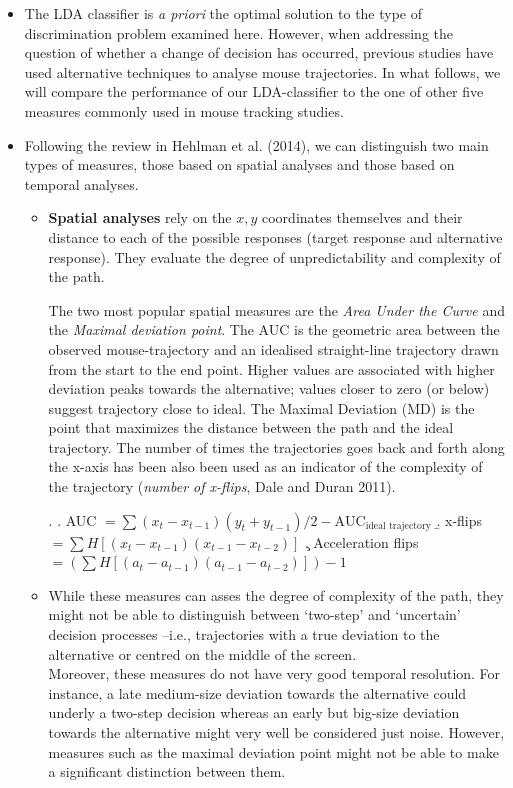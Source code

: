 \documentclass{article}
\begin{document}
\begin{itemize}

\item The LDA classifier is \emph{a priori} the optimal solution to the type of discrimination problem examined here. However, when addressing the question of whether a change of decision has occurred, previous studies have used alternative techniques to analyse mouse trajectories. In what follows, we will compare the performance of our LDA-classifier to the one of other five measures commonly used in mouse tracking studies. 

\item Following the review in Hehlman et al. (2014), we can distinguish two main types of measures, those based on spatial analyses and those based on temporal analyses. 

\begin{itemize}
\item \textbf{Spatial analyses} rely on the $x,y$ coordinates themselves and their distance to each of the possible responses (target response and alternative response). They evaluate the degree of unpredictability and complexity of the path. 

The two most popular spatial measures are the \textit{Area Under the Curve} and the \textit{Maximal deviation point}. The AUC is the geometric area between the observed mouse-trajectory and an idealised straight-line trajectory drawn from the start to the end point. Higher values are associated with higher deviation peaks towards the alternative; values closer to zero (or below) suggest trajectory close to ideal. 
The Maximal Deviation (MD) is the point that maximizes the distance between the path and the ideal trajectory.  
The number of times the trajectories goes back and forth along the x-axis has been also been used as an indicator of the complexity of the trajectory (\emph{number of x-flips}, Dale and Duran 2011).

\ex. 
\a. AUC \(= \sum (x_{t} -  x_{t-1})( y_{t} + y_{t-1})/2  - \text{AUC}_{\text{ideal trajectory}} \)
\b.  x-flips  \(= \sum H[(x_{t} - x_{t-1})(x_{t-1} - x_{t-2})] \)
\c. Acceleration flips \(= (\sum H[( a_{t} - a_{t-1})( a_{t-1} - a_{t-2})])-1 \)

\item While these measures can asses the degree of complexity of the path, they might not be able to distinguish between `two-step' and `uncertain' decision processes --i.e., trajectories with a true deviation to the alternative or centred on the middle of the screen. \\
Moreover, these measures do not have very good temporal resolution.  
For instance, a late medium-size deviation towards the alternative could underly a two-step decision whereas an early but big-size deviation towards the alternative might very well be considered just noise. However, measures such as the maximal deviation point might not be able to make a significant distinction between them. 


\end{itemize}
\end{itemize}
\end{document}
